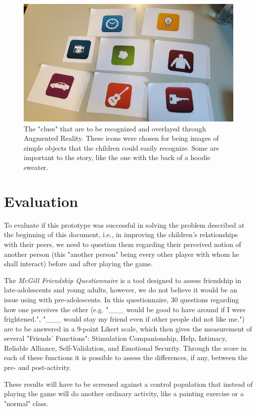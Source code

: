 \documentclass[runningheads]{llncs}
\begin{document}
\begin{figure}
    \centering
    \includegraphics[scale = 0.3]{Icons.jpg}
    \caption{The "clues" that are to be recognized and overlayed through Augmented Reality. These icons were chosen for being images of simple objects that the children could easily recognize. Some are important to the story, like the one with the back of a hoodie sweater. }
    \label{fig:icons}
\end{figure}

\section{Evaluation}
\par To evaluate if this prototype was successful in solving the problem described at the beginning of this document, i.e., in improving the children's relationships with their peers, we need to question them regarding their perceived notion of another person (this "another person" being every other player with whom he shall interact) before and after playing the game. 
\par The \textit{McGill Friendship Questionnaire} is a tool designed to assess friendship in late-adolescents and young adults, however, we do not believe it would be an issue using with pre-adolescents. In this questionnaire, 30 questions regarding how one perceives the other (e.g. "\_\_\_ would be good to have around if I were frightened.", "\_\_\_ would stay my friend even if other people did not like me.") are to be answered in a 9-point Likert scale, which then gives the measurement of several "Friends' Functions": Stimulation Companionship, Help, Intimacy, Reliable Alliance, Self-Validation, and Emotional Security. Through the score in each of these functions it is possible to assess the differences, if any, between the pre- and post-activity. 
\par These results will have to be screened against a control population that instead of playing the game will do another ordinary activity, like a painting exercise or a "normal" class.
\end{document}
